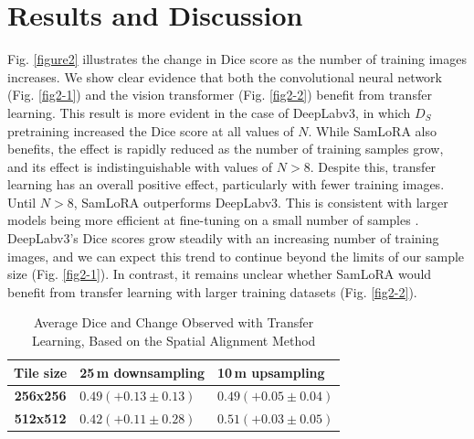 \documentclass[lettersize,journal]{IEEEtran}
\begin{document}
\section{Results and Discussion} 
Fig. \ref{figure2} illustrates the change in Dice score as the number of training images increases. We show clear evidence that both the convolutional neural network (Fig. \ref{fig2-1}) 
and the vision transformer (Fig. \ref{fig2-2}) benefit from transfer learning. This result is more evident in the case of DeepLabv3, in which $\mathit{D}_S$ pretraining increased the Dice score at all values of \( N \).
While SamLoRA also benefits, the effect is rapidly reduced as the number of training samples grow, and its effect is indistinguishable with values of \( N > 8 \). Despite this, transfer learning has an overall positive effect, 
particularly with fewer training images. Until \( N > 8 \), SamLoRA outperforms DeepLabv3. This is consistent with larger models being more efficient at fine-tuning on a small number of samples \cite{zhaiScalingVisionTransformers2022}. 
DeepLabv3's Dice scores grow steadily with an increasing number of training images, and we can expect this trend to continue beyond the limits of our sample size (Fig. \ref{fig2-1}). In contrast, it remains unclear whether SamLoRA 
would benefit from transfer learning with larger training datasets (Fig. \ref{fig2-2}).
\begin{table}[t]
    \caption{Average Dice and Change Observed with Transfer Learning, Based on the Spatial Alignment Method\label{table2}}
    \centering
    \begin{tabular}{c>{\centering\arraybackslash}m{3cm}>{\centering\arraybackslash}m{2.6cm}}
    \toprule
    \textbf{Tile size} & \textbf{25\,m downsampling} & \textbf{10\,m upsampling} \\
    \midrule
    \textbf{256x256} & $0.49 (+0.13 \pm 0.13)$ & $0.49 (+0.05 \pm 0.04)$ \\
    \textbf{512x512} & $0.42 (+0.11 \pm 0.28)$ & $0.51 (+0.03 \pm 0.05)$ \\
    \bottomrule
    \end{tabular}
\end{table}
\end{document}
